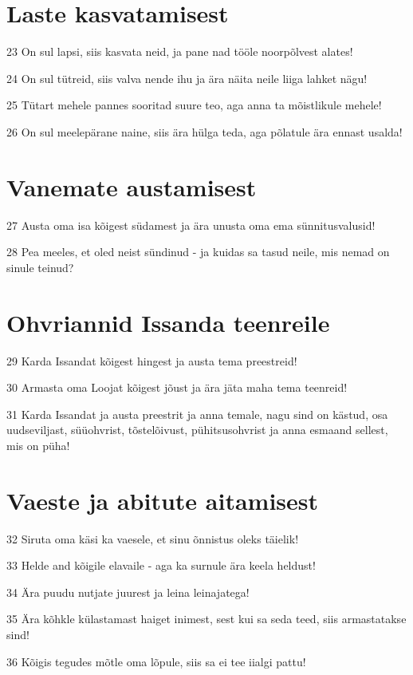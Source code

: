 \section*{Laste kasvatamisest}

\par 23 On sul lapsi, siis kasvata neid, ja pane nad tööle noorpõlvest alates!
\par 24 On sul tütreid, siis valva nende ihu ja ära näita neile liiga lahket nägu!
\par 25 Tütart mehele pannes sooritad suure teo, aga anna ta mõistlikule mehele!
\par 26 On sul meelepärane naine, siis ära hülga teda, aga põlatule ära ennast usalda!

\section*{Vanemate austamisest}

\par 27 Austa oma isa kõigest südamest ja ära unusta oma ema sünnitusvalusid!
\par 28 Pea meeles, et oled neist sündinud - ja kuidas sa tasud neile, mis nemad on sinule teinud?
\section*{Ohvriannid Issanda teenreile}

\par 29 Karda Issandat kõigest hingest ja austa tema preestreid!
\par 30 Armasta oma Loojat kõigest jõust ja ära jäta maha tema teenreid!
\par 31 Karda Issandat ja austa preestrit ja anna temale, nagu sind on kästud, osa uudseviljast, süüohvrist, tõstelõivust, pühitsusohvrist ja anna esmaand sellest, mis on püha!

\section*{Vaeste ja abitute aitamisest}

\par 32 Siruta oma käsi ka vaesele, et sinu õnnistus oleks täielik!
\par 33 Helde and kõigile elavaile - aga ka surnule ära keela heldust!
\par 34 Ära puudu nutjate juurest ja leina leinajatega!
\par 35 Ära kõhkle külastamast haiget inimest, sest kui sa seda teed, siis armastatakse sind!
\par 36 Kõigis tegudes mõtle oma lõpule, siis sa ei tee iialgi pattu!

